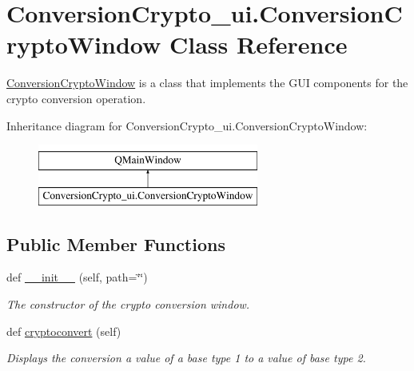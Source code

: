 \hypertarget{class_conversion_crypto__ui_1_1_conversion_crypto_window}{}\section{Conversion\+Crypto\+\_\+ui.\+Conversion\+Crypto\+Window Class Reference}
\label{class_conversion_crypto__ui_1_1_conversion_crypto_window}


\hyperlink{class_conversion_crypto__ui_1_1_conversion_crypto_window}{Conversion\+Crypto\+Window} is a class that implements the G\+UI components for the crypto conversion operation.  


Inheritance diagram for Conversion\+Crypto\+\_\+ui.\+Conversion\+Crypto\+Window\+:\begin{figure}[H]
\begin{center}
\leavevmode
\includegraphics[height=2.000000cm]{class_conversion_crypto__ui_1_1_conversion_crypto_window}
\end{center}
\end{figure}
\subsection*{Public Member Functions}
\begin{DoxyCompactItemize}
\item 
def \hyperlink{class_conversion_crypto__ui_1_1_conversion_crypto_window_a2c076dd5a4c7905c9e8898ace06516ad}{\+\_\+\+\_\+init\+\_\+\+\_\+} (self, path=\char`\"{}\char`\"{})
\begin{DoxyCompactList}\small\item\em The constructor of the crypto conversion window. \end{DoxyCompactList}\item 
def \hyperlink{class_conversion_crypto__ui_1_1_conversion_crypto_window_a1348e819d5c05e07ccf156235ba333e9}{cryptoconvert} (self)
\begin{DoxyCompactList}\small\item\em Displays the conversion a value of a base type 1 to a value of base type 2. \end{DoxyCompactList}\end{DoxyCompactItemize}

